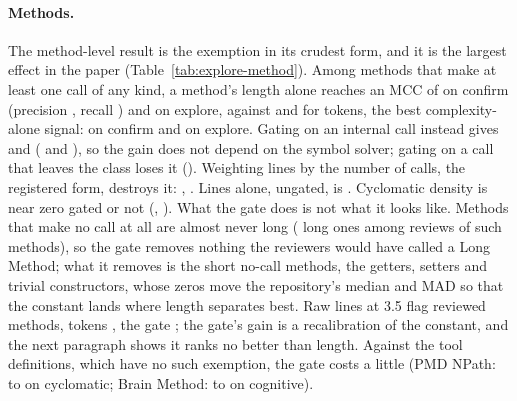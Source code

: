 \documentclass[11pt,a4paper]{article}
\newcommand{\madz}{modified $z \geq 3.5$}
\newcommand{\fitwidth}[1]{\resizebox{\ifdim\width>\textwidth\textwidth\else\width\fi}{!}{#1}}
\begin{document}
\begin{table}[t]
\centering
\caption{Exploratory, post hoc: method forms against MLCQ human Long Method
on each half, by \madz{}. A gate ``[makes a call]'' multiplies by 1 or 0;
``internal'' means a call that resolves to the repository's own code,
``any'' any call site whatever its target. Precision and recall are on the
confirm half; the paired differences are against tokens (the best
complexity-alone signal) and against lines.}
\label{tab:explore-method}
\footnotesize
\setlength{\tabcolsep}{3pt}
\fitwidth{}
\end{table}

\paragraph{Methods.} The method-level result is the exemption in its
crudest form, and it is the largest effect in the paper
(Table~\ref{tab:explore-method}). Among methods that make at least one call
of any kind, a method's length alone reaches an MCC of
\expGateAnyConfirmMcc{} on confirm (precision \expGateAnyConfirmPrecision{},
recall \expGateAnyConfirmRecall{}) and \expGateAnyExploreMcc{} on explore,
against \expTokensConfirmMcc{} and \expTokensExploreMcc{} for tokens, the
best complexity-alone signal: \expGateAnyConfirmVsTokens{} on confirm and
\expGateAnyExploreVsTokens{} on explore. Gating on an internal call instead
gives \expGateIntConfirmMcc{} and \expGateIntExploreMcc{}
(\expGateIntConfirmVsTokens{} and \expGateIntExploreVsTokens{}), so the gain
does not depend on the symbol solver; gating on a call that leaves the class
loses it (\expGateLeaveConfirmMcc{}). Weighting lines by the number of calls,
the registered form, destroys it: \expWeightConfirmMcc{},
\expWeightConfirmVsTokens{}. Lines alone, ungated, is \expLinesConfirmMcc{}.
Cyclomatic density is near zero gated or not (\expDensityGateConfirmMcc{},
\expMethodDensityConfirmMcc{}). What the gate does is not what it looks
like. Methods that make no call at all are almost never long
(\revNoCallLong{} long ones among \revNoCallReviews{} reviews of such
methods), so the gate removes nothing the reviewers would have called a
Long Method; what it removes is the short no-call methods, the getters,
setters and trivial constructors, whose zeros move the repository's median
and MAD so that the constant lands where length separates best. Raw lines
at 3.5 flag \matchedLinesOwnFlagsConfirm{} reviewed methods, tokens
\matchedTokensOwnFlagsConfirm{}, the gate \matchedGateOwnFlagsConfirm{};
the gate's gain is a recalibration of the constant, and the next paragraph
shows it ranks no better than length. Against the tool definitions, which have no
such exemption, the gate costs a little (PMD NPath: \expToolNpathCcMcc{} to
\expToolNpathCcGateMcc{} on cyclomatic; Brain Method:
\expToolBrainCogMcc{} to \expToolBrainCogGateMcc{} on cognitive).
\end{document}
